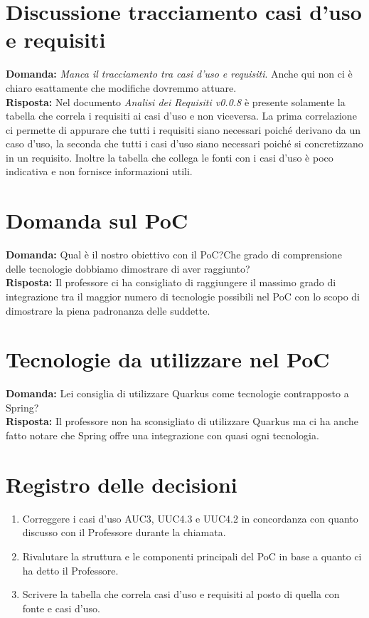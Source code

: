 \documentclass{article}
\begin{document}
\section{Discussione tracciamento casi d'uso e requisiti}%
\label{sec:discussione_tracciamento_casi_requisiti}
\textbf{Domanda:} \textit{Manca il tracciamento tra casi d’uso e requisiti}. Anche qui non ci è chiaro esattamente che modifiche dovremmo attuare.\\
\textbf{Risposta:} Nel documento \textit{Analisi dei Requisiti v0.0.8} è presente solamente la tabella che correla i requisiti ai casi d'uso e non viceversa.
La prima correlazione ci permette di appurare che tutti i requisiti siano necessari poiché derivano da un caso d'uso, la seconda che tutti i casi d'uso siano necessari poiché si concretizzano in un requisito.
Inoltre la tabella che collega le fonti con i casi d'uso è poco indicativa e non fornisce informazioni utili.

\section{Domanda sul PoC}%
\label{sec:domanda_poc}
\textbf{Domanda:} Qual è il nostro obiettivo con il PoC?\@ Che grado di comprensione delle tecnologie dobbiamo dimostrare di aver raggiunto?\\
\textbf{Risposta:} Il professore ci ha consigliato di raggiungere il massimo grado di integrazione tra il maggior numero di tecnologie possibili nel PoC con lo scopo di dimostrare la piena padronanza delle suddette.

\section{Tecnologie da utilizzare nel PoC}%
\label{sec:tecnologie_poc}
\textbf{Domanda:} Lei consiglia di utilizzare Quarkus come tecnologie contrapposto a Spring?\\
\textbf{Risposta:} Il professore non ha sconsigliato di utilizzare Quarkus ma ci ha anche fatto notare che Spring offre una integrazione con quasi ogni tecnologia.
\newpage
\section{Registro delle decisioni}%
\label{sec:registro_delle_decisioni}

\begin{enumerate}
  \item Correggere i casi d'uso AUC3, UUC4.3 e UUC4.2 in concordanza con quanto discusso con il Professore durante la chiamata.
  \item Rivalutare la struttura e le componenti principali del PoC in base a quanto ci ha detto il Professore.
  \item Scrivere la tabella che correla casi d'uso e requisiti al posto di quella con fonte e casi d'uso.
\end{enumerate}

\end{document}
